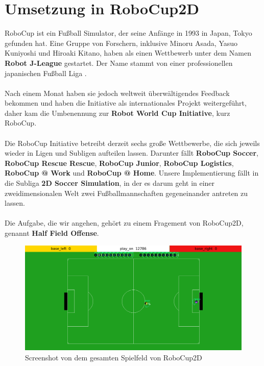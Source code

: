 \chapter{Umsetzung in RoboCup2D}
    RoboCup ist ein Fußball Simulator, der seine Anfänge in 1993 in Japan, Tokyo gefunden hat. Eine Gruppe von Forschern, inklusive Minoru Asada, Yasuo Kuniyoshi und Hiroaki Kitano, haben als einen Wettbewerb unter dem Namen \textbf{Robot J-League} gestartet. Der Name stammt von einer professionellen japanischen Fußball Liga \cite{hfo-history}.\\
    \\
    Nach einem Monat haben sie jedoch weltweit überwältigendes Feedback bekommen und haben die Initiative als internationales Projekt weitergeführt, daher kam die Umbenennung zur \textbf{Robot World Cup Initiative}, kurz RoboCup. \\
    \\
    Die RoboCup Initiative betreibt derzeit sechs große Wettbewerbe, die sich jeweils wieder in Ligen und Subligen aufteilen lassen. Darunter fällt \textbf{RoboCup Soccer}, \textbf{RoboCup Rescue Rescue}, \textbf{RoboCup Junior}, \textbf{RoboCup Logistics}, \textbf{RoboCup @ Work} und \textbf{RoboCup @ Home}. Unsere Implementierung fällt in die Subliga \textbf{2D Soccer Simulation}, in der es darum geht in einer zweidimensionalen Welt zwei Fußballmannschaften gegeneinander antreten zu lassen.\\
    \\
    Die Aufgabe, die wir angehen, gehört zu einem Fragement von RoboCup2D, genannt \textbf{Half Field Offense}.\\

    \begin{figure}[htbp]
        \includegraphics[width = 1.0\textwidth, center]{../pictures/full-field.png}
        \caption{Screenshot von dem gesamten Spielfeld von RoboCup2D \label{fig:somelabel}}
    \end{figure}

